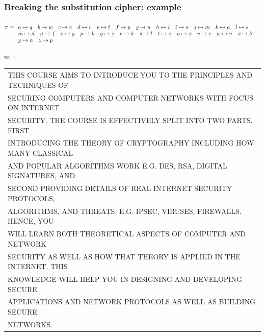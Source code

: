\documentclass[aspectratio=169, lualatex, 10pt,dvipsnames,svgnames]{beamer} %
\def\enbleu#1{\textcolor{bleu}{#1}}
\def\enrouge#1{\textcolor{rouge}{#1}}
\begin{document}
\begin{frame}
  \frametitle{Breaking the substitution cipher: example}
  
  \enrouge{
    \tiny{$\pi=
      \begin{array}[t]{l}
        a\mapsto q\quad b\mapsto w\quad c\mapsto e\quad d\mapsto r\quad e\mapsto t\quad f\mapsto y\quad g\mapsto u\quad h\mapsto i\quad 
        i\mapsto o\quad j\mapsto m\quad k\mapsto a\quad l\mapsto s \quad \\
        m\mapsto d\quad n\mapsto f\quad o\mapsto g\quad p\mapsto h\quad q\mapsto j\quad r\mapsto k\quad s\mapsto l\quad t\mapsto z\quad 
        u\mapsto x\quad v\mapsto c\quad w\mapsto v\quad x\mapsto b \quad \\
        y\mapsto n\quad z\mapsto p\
      \end{array}
      $}}
  \vspace{0.25cm}


  \enbleu{
  \tiny{m =
      \begin{tabular}[t]{l}
        THIS COURSE AIMS TO INTRODUCE YOU TO THE PRINCIPLES AND TECHNIQUES OF \\ 
        SECURING COMPUTERS AND COMPUTER NETWORKS WITH FOCUS ON INTERNET \\
        SECURITY. THE COURSE IS EFFECTIVELY SPLIT INTO TWO PARTS. FIRST \\ 
        INTRODUCING THE THEORY OF CRYPTOGRAPHY INCLUDING HOW MANY CLASSICAL \\
        AND POPULAR ALGORITHMS WORK E.G. DES, RSA, DIGITAL SIGNATURES, AND \\
        SECOND PROVIDING DETAILS OF REAL INTERNET SECURITY PROTOCOLS, \\
        ALGORITHMS, AND THREATS, E.G. IPSEC, VIRUSES, FIREWALLS. HENCE, YOU \\
        WILL LEARN BOTH THEORETICAL ASPECTS OF COMPUTER AND NETWORK \\
        SECURITY AS WELL AS HOW THAT THEORY IS APPLIED IN THE INTERNET. THIS \\
        KNOWLEDGE WILL HELP YOU IN DESIGNING AND DEVELOPING SECURE \\
        APPLICATIONS AND NETWORK PROTOCOLS AS WELL AS BUILDING SECURE \\
        NETWORKS.
      \end{tabular}
  }}
  \vspace{0.5cm}

  \normalsize
  \color{black}{Going back to letter frequency and a few more guesses!!}
    \color{black}
\end{frame}
\end{document}
